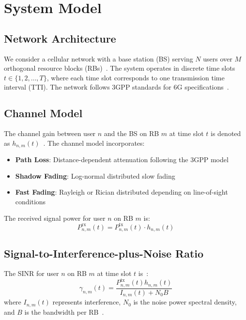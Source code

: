 \documentclass[conference]{IEEEtran}
\begin{document}
\section{System Model}

\subsection{Network Architecture}

We consider a cellular network with a base station (BS) serving $N$ users over $M$ orthogonal resource blocks (RBs)~\cite{tse_fundamentals}. The system operates in discrete time slots $t \in \{1, 2, \ldots, T\}$, where each time slot corresponds to one transmission time interval (TTI). The network follows 3GPP standards for 6G specifications~\cite{nextg_requirements,energy_efficient_6g}.

\subsection{Channel Model}

The channel gain between user $n$ and the BS on RB $m$ at time slot $t$ is denoted as $h_{n,m}(t)$~\cite{channel_estimation}. The channel model incorporates:
\begin{itemize}
    \item \textbf{Path Loss}: Distance-dependent attenuation following the 3GPP model~\cite{tse_fundamentals}
    \item \textbf{Shadow Fading}: Log-normal distributed slow fading~\cite{channel_estimation}
    \item \textbf{Fast Fading}: Rayleigh or Rician distributed depending on line-of-sight conditions~\cite{csi_feedback}
\end{itemize}

The received signal power for user $n$ on RB $m$ is:
\begin{equation}
P_{n,m}^{\text{rx}}(t) = P_{n,m}^{\text{tx}}(t) \cdot h_{n,m}(t)
\end{equation}

\subsection{Signal-to-Interference-plus-Noise Ratio}

The SINR for user $n$ on RB $m$ at time slot $t$ is~\cite{tse_fundamentals}:
\begin{equation}
\gamma_{n,m}(t) = \frac{P_{n,m}^{\text{tx}}(t) h_{n,m}(t)}{I_{n,m}(t) + N_0 B}
\end{equation}
where $I_{n,m}(t)$ represents interference, $N_0$ is the noise power spectral density, and $B$ is the bandwidth per RB~\cite{qos_wireless}.
\end{document}
